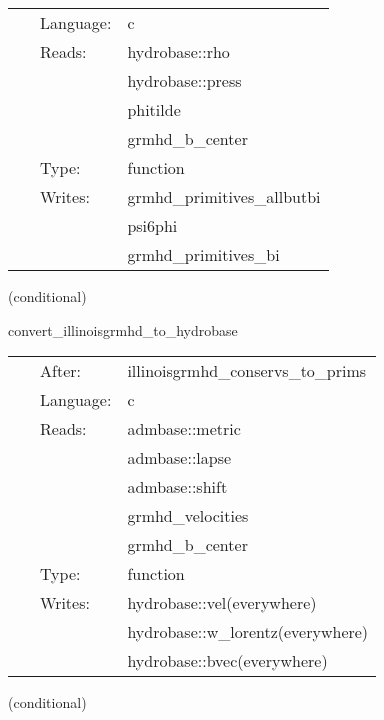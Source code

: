 \hspace{5mm}

 \begin{tabular*}{160mm}{cll} 
~ & Language:  & c \\ 
~ & Reads:  & hydrobase::rho \\ 
~& ~ &hydrobase::press\\ 
~& ~ &phitilde\\ 
~& ~ &grmhd\_b\_center\\ 
~ & Type:  & function \\ 
~ & Writes:  & grmhd\_primitives\_allbutbi \\ 
~& ~ &psi6phi\\ 
~& ~ &grmhd\_primitives\_bi\\ 
\end{tabular*} 


\vspace{5mm}

   (conditional) 

\hspace{5mm} convert\_illinoisgrmhd\_to\_hydrobase 

\hspace{5mm}{\it convert illinoisgrmhd-native variables to hydrobase } 


\hspace{5mm}

 \begin{tabular*}{160mm}{cll} 
~ & After:  & illinoisgrmhd\_conservs\_to\_prims \\ 
~ & Language:  & c \\ 
~ & Reads:  & admbase::metric \\ 
~& ~ &admbase::lapse\\ 
~& ~ &admbase::shift\\ 
~& ~ &grmhd\_velocities\\ 
~& ~ &grmhd\_b\_center\\ 
~ & Type:  & function \\ 
~ & Writes:  & hydrobase::vel(everywhere) \\ 
~& ~ &hydrobase::w\_lorentz(everywhere)\\ 
~& ~ &hydrobase::bvec(everywhere)\\ 
\end{tabular*} 


\vspace{5mm}

   (conditional) 

